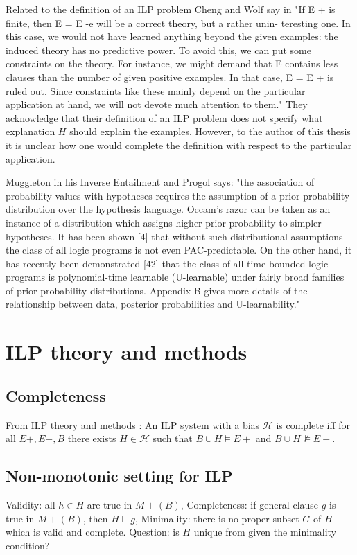 Related to the definition of an ILP problem Cheng and Wolf say in \cite{cheng1997}
"If E + is finite, then E = E -e will be a correct theory, but a rather unin-
teresting one. In this case, we would not have learned anything beyond the
given examples: the induced theory has no predictive power. To avoid this,
we can put some constraints on the theory. For instance, we might demand
that E contains less clauses than the number of given positive examples. In
that case, E = E + is ruled out. Since constraints like these mainly depend
on the particular application at hand, we will not devote much attention to
them."
They acknowledge that their definition of an ILP problem does not specify what explanation $H$ should explain the examples. However, to the author of this thesis it is unclear how one would complete the definition with respect to the particular application.

Muggleton in his Inverse Entailment and Progol \cite{muggleton1995} says:
"the association of probability values with hypotheses requires the assumption of a prior probability distribution over the hypothesis language. Occam's razor can be taken as an instance of a distribution which assigns higher prior probability to simpler hypotheses. It has been shown [4] that without such distributional assumptions the class of all logic programs is not even PAC-predictable. On the other hand, it has recently been demonstrated [42] that the class of all time-bounded logic programs is polynomial-time learnable (U-learnable) under fairly broad families of prior probability distributions. Appendix B gives more details of the relationship between data, posterior probabilities and U-learnability."

\section{ILP theory and methods}
\subsection{Completeness}
From ILP theory and methods \cite{muggleton1994}:
An ILP system with a bias $\mathcal{H}$ is complete iff for all $E+, E-,B$ there exists $H \in \mathcal{H}$ such that $B \cup H \models E+$ and $B \cup H \not \models E-$.
\subsection{Non-monotonic setting for ILP}
Validity: all $h \in H$ are true in $M+(B)$,
Completeness: if general clause $g$ is true in $M+(B)$, then $H \models g$,	
Minimality: there is no proper subset $G$ of $H$ which is valid and complete.
Question: is $H$ unique from given the minimality condition?

